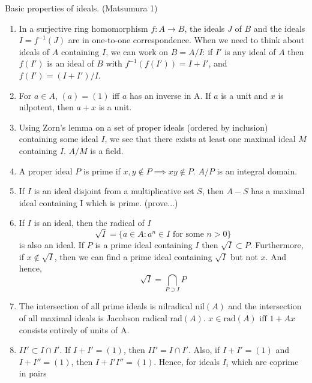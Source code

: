 \begin{notes}
      Basic properties of ideals. (Matsumura 1)
\end{notes}

\begin{enumerate}
      \item
            In a surjective ring homomorphism $f:A \to B$, the ideals $J$
            of $B$ and the ideals $I=f^{-1}(J)$ are in one-to-one
            correspondence. When we need to think about ideals of $A$
            containing $I$, we can work on $B=A/I$: if $I'$ is any ideal of
            $A$ then $f(I')$ is an ideal of $B$ with $f^{-1}(f(I'))=I+I'$,
            and $f(I') = (I+I')/I$.
      \item
            For $a \in A$, $(a)=(1)$ iff $a$ has an inverse in A.
            If $a$ is a unit and $x$ is nilpotent, then $a+x$ is a unit.
      \item
            Using Zorn's lemma on a set of proper ideals (ordered by inclusion)
            containing some ideal $I$, we see that
            there exists at least one maximal ideal $M$ containing $I$.
            $A/M$ is a field.
      \item
            A proper ideal $P$ is prime if $x,y \notin P \implies xy \notin
                  P$. $A/P$ is an integral domain.
      \item
            If $I$ is an ideal disjoint from a multiplicative set $S$, then $A-S$
            has a maximal ideal containing I which is prime. (prove...)
      \item
            If $I$ is an ideal, then the radical of $I$
            $$ \sqrt{I}=\{a\in A : a^n \in I \text{ for some } n>0\}$$
            is also an ideal. If $P$ is a prime ideal containing $I$ then $\sqrt{I}
                  \subset P$. Furthermore, if $x \notin \sqrt{I}$, then we can find
            a prime ideal containing $\sqrt{I}$ but not $x$. And hence,
            $$\sqrt{I}=\bigcap_{P \supset I}{P}$$
      \item
            The intersection of all prime ideals is nilradical nil$(A)$ and the
            intersection of all maximal ideals is Jacobson radical rad$(A)$.
            $x\in \text{rad}(A) \text{ iff } 1+Ax$ consists entirely of units of A.
      \item\label{idealsinduction}
            $II' \subset I\cap I'$. If $I+I'=(1)$, then $II' = I\cap I'$. Also,
            if $I+I'=(1)$ and $I+I''=(1)$, then $I+I'I'' = (1)$. Hence, for ideals
            $I_i$ which are coprime in pairs

\end{enumerate}
